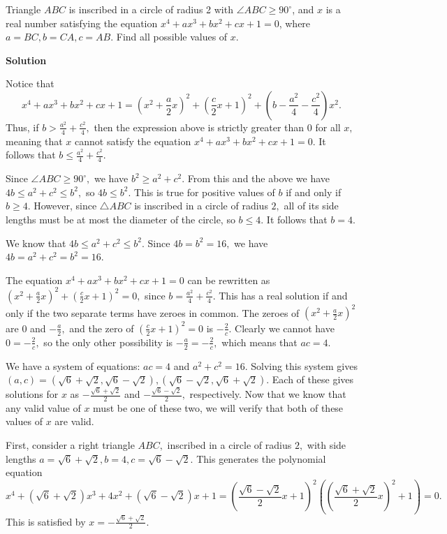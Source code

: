 \begin{enumerate}
 Triangle $ABC$ is inscribed in a circle of radius 2 with $\angle ABC \geq 90^\circ$, and $x$ is a real number satisfying the equation $x^4 + ax^3 + bx^2 + cx + 1 = 0$, where $a=BC,b=CA,c=AB$. Find all possible values of $x$.


 



\textbf{Solution}

Notice that
 \[x^4 + ax^3 + bx^2 + cx + 1 = \left(x^2 + \frac{a}{2}x\right)^2 + \left(\frac{c}{2}x + 1\right)^2 + \left(b - \frac{a^2}{4} - \frac{c^2}{4}\right)x^2.\]Thus, if $b > \frac{a^2}{4} + \frac{c^2}{4},$ then the expression above is strictly greater than $0$ for all $x,$ meaning that $x$ cannot satisfy the equation $x^4 + ax^3 + bx^2 + cx + 1 = 0.$ It follows that $b\le\frac{a^2}{4} + \frac{c^2}{4}.$

 Since $\angle ABC\ge 90^{\circ},$ we have $b^2\ge a^2 + c^2.$ From this and the above we have $4b\le a^2 + c^2\le b^2,$ so $4b\le b^2.$ This is true for positive values of $b$ if and only if $b\ge 4.$ However, since $\triangle ABC$ is inscribed in a circle of radius $2,$ all of its side lengths must be at most the diameter of the circle, so $b\le 4.$ It follows that $b=4.$

 We know that $4b\le a^2 + c^2\le b^2.$ Since $4b = b^2 = 16,$ we have $4b = a^2 + c^2 = b^2 = 16.$

 The equation $x^4 + ax^3 + bx^2 + cx + 1 = 0$ can be rewritten as $\left(x^2 + \frac{a}{2}x\right)^2 + \left(\frac{c}{2}x + 1\right)^2 = 0,$ since $b = \frac{a^2}{4} + \frac{c^2}{4}.$ This has a real solution if and only if the two separate terms have zeroes in common. The zeroes of $\left(x^2 + \frac{a}{2}x\right)^2$ are $0$ and $-\frac{a}{2},$ and the zero of $\left(\frac{c}{2}x + 1\right)^2 = 0$ is $-\frac{2}{c}.$ Clearly we cannot have $0=-\frac{2}{c},$ so the only other possibility is $-\frac{a}{2} = -\frac{2}{c},$ which means that $ac = 4.$

 We have a system of equations: $ac = 4$ and $a^2 + c^2 = 16.$ Solving this system gives $(a, c) = \left(\sqrt{6}+\sqrt{2}, \sqrt{6}-\sqrt{2}\right), \left(\sqrt{6}-\sqrt{2}, \sqrt{6}+\sqrt{2}\right).$ Each of these gives solutions for $x$ as $-\frac{\sqrt{6}+\sqrt{2}}{2}$ and $-\frac{\sqrt{6}-\sqrt{2}}{2},$ respectively. Now that we know that any valid value of $x$ must be one of these two, we will verify that both of these values of $x$ are valid.

 First, consider a right triangle $ABC,$ inscribed in a circle of radius $2,$ with side lengths $a = \sqrt{6}+\sqrt{2}, b = 4, c = \sqrt{6}-\sqrt{2}.$ This generates the polynomial equation
 \[x^4 + \left(\sqrt{6}+\sqrt{2}\right)x^3 + 4x^2 + \left(\sqrt{6}-\sqrt{2}\right)x + 1 = \left(\frac{\sqrt{6}-\sqrt{2}}{2}x + 1\right)^2\left(\left(\frac{\sqrt{6}+\sqrt{2}}{2}x\right)^2+1\right) = 0.\]This is satisfied by $x=-\frac{\sqrt{6}+\sqrt{2}}{2}.$


\end{enumerate}
